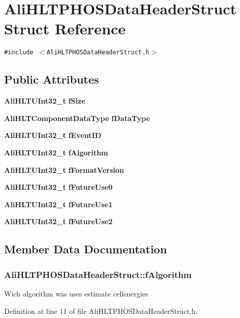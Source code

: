 \section{Ali\-HLTPHOSData\-Header\-Struct Struct Reference}
\label{structAliHLTPHOSDataHeaderStruct}
{\tt \#include $<$Ali\-HLTPHOSData\-Header\-Struct.h$>$}

\subsection*{Public Attributes}
\begin{CompactItemize}
\item 
{\bf Ali\-HLTUInt32\_\-t} {\bf f\-Size}
\item 
{\bf Ali\-HLTComponent\-Data\-Type} {\bf f\-Data\-Type}
\item 
{\bf Ali\-HLTUInt32\_\-t} {\bf f\-Event\-ID}
\item 
{\bf Ali\-HLTUInt32\_\-t} {\bf f\-Algorithm}
\item 
{\bf Ali\-HLTUInt32\_\-t} {\bf f\-Format\-Version}
\item 
{\bf Ali\-HLTUInt32\_\-t} {\bf f\-Future\-Use0}
\item 
{\bf Ali\-HLTUInt32\_\-t} {\bf f\-Future\-Use1}
\item 
{\bf Ali\-HLTUInt32\_\-t} {\bf f\-Future\-Use2}
\end{CompactItemize}


\subsection{Member Data Documentation}
\subsubsection{ {\bf Ali\-HLTPHOSData\-Header\-Struct::f\-Algorithm}}\label{structAliHLTPHOSDataHeaderStruct_o3}


Wich algorithm was uses estimate cellenergies 

Definition at line 11 of file Ali\-HLTPHOSData\-Header\-Struct.h.
